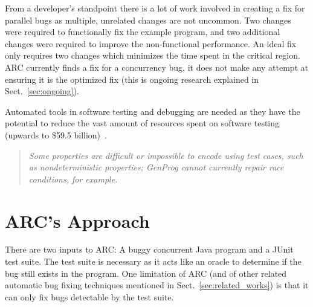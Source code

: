 \documentclass{llncs}
\begin{document}
From a developer's standpoint there is a lot of work involved in creating a fix
for parallel bugs as multiple, unrelated changes are not uncommon.
Two changes were required to functionally fix the example program, and two additional changes were required to improve the non-functional performance. An ideal fix only requires two changes which minimizes the time spent in the critical region. ARC currently finds a fix for a concurrency bug, it does not make any attempt at ensuring it is the optimized fix (this is ongoing research explained in Sect.~\ref{sec:ongoing}).

Automated tools in software testing and debugging are needed as they have the
potential to reduce the vast amount of resources spent on software testing
(upwards to \$59.5 billion)~\cite{RTI02}.

\begin{quote}
\textit{Some properties are difficult or impossible to encode using test cases,
such as nondeterministic properties; GenProg cannot currently repair race
conditions, for example.}~\cite{GNFW11}
\end{quote}

\section{ARC's Approach}
\label{sec:approach}



There are two inputs to ARC: A buggy concurrent Java program and a JUnit test
suite. The test suite is necessary as it acts like an oracle to determine if
the bug still exists in the program. One limitation of ARC (and of other
related automatic bug fixing techniques mentioned in
Sect.~\ref{sec:related_works}) is that it can only fix bugs detectable by the
test suite.

\end{document}
